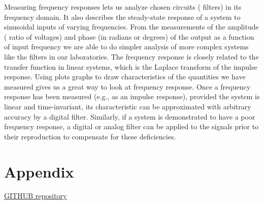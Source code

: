 \documentclass[notitlepage, a4paper, 11pt]{article}
\begin{document}
	Measuring frequency responses lets us analyze chosen circuits ( filters) in its frequency domain.
	It also describes the steady-state response of a system to sinusoidal inputs of varying frequencies.
	From the measurements of the amplitude ( ratio of voltages) and phase (in radians or degrees) of the output as a function of input frequency
	we are able to do simpler analysis of  more complex systems like the filters in our laboratories.
	The frequency response is closely related to the transfer function in linear systems, which is the Laplace transform of the impulse response.
	Using plots graphs to draw characteristics of the quantities we have measured gives us a great way to look at frequency response.
	Once a frequency response has been measured (e.g., as an impulse response), provided the system is linear and time-invariant, 
	its characteristic can be approximated with arbitrary accuracy by a digital filter. Similarly, if a system
	is demonstrated to have a poor frequency response, a digital or analog filter can be applied to the signals prior to their reproduction to compensate for these deficiencies.
	
	
	\newpage
	\appendix
	\section{Appendix}\label{sec:appendix}
	\href{https://github.com/kamilix2003/CT_labs}{GITHUB repository}
	\inputminted{matlab}{../Matlab/main.m}
	\inputminted{matlab}{../Matlab/import_csv.m}
	\inputminted{matlab}{../Matlab/characteristics.m}
\end{document}

